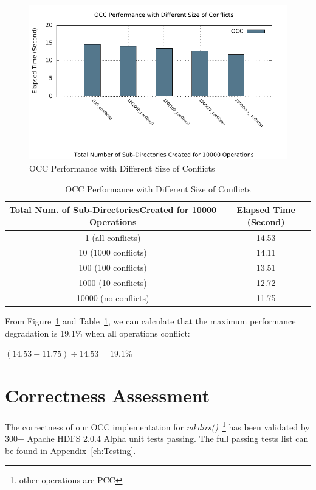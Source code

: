 \begin{figure}[ht]
	\centering
	\includegraphics[width=\linewidth]{figs/conflict.pdf}
	\caption{OCC Performance with Different Size of Conflicts}
	\label{fig:conflict}
\end{figure}

\begin{table}[ht]
	\centering
\begin{tabular}{|c|c|}
	\hline
	\textbf{Total Num. of Sub-DirectoriesCreated for 10000 Operations} & \textbf{Elapsed Time (Second)} \\ \hline
	1 (all conflicts)                                                  & 14.53                          \\ \hline
	10 (1000 conflicts)                                                & 14.11                          \\ \hline
	100 (100 conflicts)                                                & 13.51                          \\ \hline
	1000 (10 conflicts)                                                & 12.72                          \\ \hline
	10000 (no conflicts)                                               & 11.75                          \\ \hline
\end{tabular}
	\caption{OCC Performance with Different Size of Conflicts}
	\label{table:conflicts}
\end{table}

\noindent From Figure~\ref{fig:conflict} and Table~\ref{table:conflicts}, we can calculate that the maximum performance degradation is 19.1\% when all operations conflict:
\begin{center}
	$(14.53-11.75) \div 14.53 = 19.1\%$
\end{center}

\section{Correctness Assessment}

The correctness of our OCC implementation for \textit{mkdirs()}~\footnote{other operations are PCC} has been validated by 300+ Apache HDFS 2.0.4 Alpha unit tests passing. The full passing tests list can be found in Appendix~\ref{ch:Testing}.